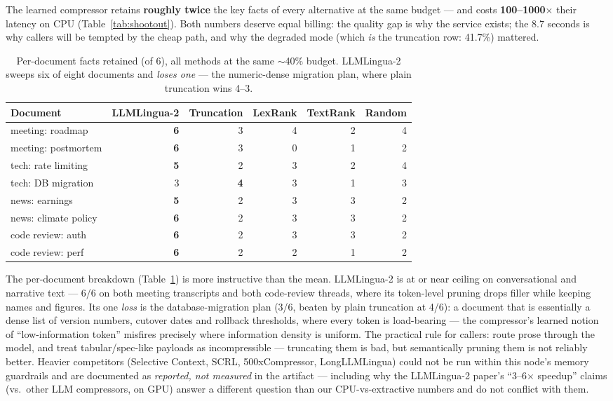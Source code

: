 \documentclass[10pt]{article}
\begin{document}
The learned compressor retains \textbf{roughly twice} the key facts of every alternative at the same budget --- and costs \textbf{100--1000$\times$} their latency on CPU (Table~\ref{tab:shootout}). Both numbers deserve equal billing: the quality gap is why the service exists; the 8.7 seconds is why callers will be tempted by the cheap path, and why the degraded mode (which \emph{is} the truncation row: 41.7\%) mattered.

\begin{table}[h]
\caption{Per-document facts retained (of 6), all methods at the same $\sim$40\% budget. LLMLingua-2 sweeps six of eight documents and \emph{loses one} --- the numeric-dense migration plan, where plain truncation wins 4--3.}
\label{tab:perdoc}
\begin{center}
\small
\begin{tabular}{lrrrrr}
\toprule
\bf Document & \bf LLMLingua-2 & \bf Truncation & \bf LexRank & \bf TextRank & \bf Random \\
\midrule
meeting: roadmap & \bf 6 & 3 & 4 & 2 & 4 \\
meeting: postmortem & \bf 6 & 3 & 0 & 1 & 2 \\
tech: rate limiting & \bf 5 & 2 & 3 & 2 & 4 \\
tech: DB migration & 3 & \bf 4 & 3 & 1 & 3 \\
news: earnings & \bf 5 & 2 & 3 & 3 & 2 \\
news: climate policy & \bf 6 & 2 & 3 & 3 & 2 \\
code review: auth & \bf 6 & 2 & 3 & 3 & 2 \\
code review: perf & \bf 6 & 2 & 2 & 1 & 2 \\
\bottomrule
\end{tabular}
\end{center}
\end{table}

The per-document breakdown (Table~\ref{tab:perdoc}) is more instructive than the mean. LLMLingua-2 is at or near ceiling on conversational and narrative text --- 6/6 on both meeting transcripts and both code-review threads, where its token-level pruning drops filler while keeping names and figures. Its one \emph{loss} is the database-migration plan (3/6, beaten by plain truncation at 4/6): a document that is essentially a dense list of version numbers, cutover dates and rollback thresholds, where every token is load-bearing --- the compressor's learned notion of ``low-information token'' misfires precisely where information density is uniform. The practical rule for callers: route prose through the model, and treat tabular/spec-like payloads as incompressible --- truncating them is bad, but semantically pruning them is not reliably better. Heavier competitors (Selective Context, SCRL, 500xCompressor, LongLLMLingua) could not be run within this node's memory guardrails and are documented as \emph{reported, not measured} in the artifact --- including why the LLMLingua-2 paper's ``3--6$\times$ speedup'' claims (vs.\ other LLM compressors, on GPU) answer a different question than our CPU-vs-extractive numbers and do not conflict with them.
\end{document}
